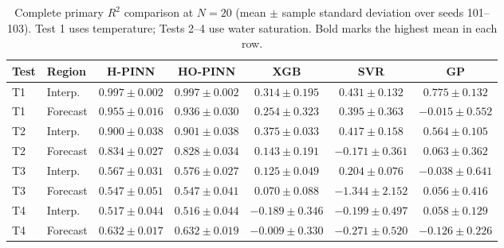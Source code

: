 \begin{table}[t]
\centering
\scriptsize
\setlength{\tabcolsep}{3.2pt}
\caption{Complete primary $R^2$ comparison at $N=20$ (mean $\pm$ sample standard deviation over seeds 101--103). Test 1 uses temperature; Tests 2--4 use water saturation. Bold marks the highest mean in each row.}
\label{tab:primary_full_n20}
\begin{tabular}{@{}llccccc@{}}
\toprule
Test & Region & H-PINN & HO-PINN & XGB & SVR & GP \\
\midrule
T1 & Interp. & \textbf{$0.997\pm0.002$} & $0.997\pm0.002$ & $0.314\pm0.195$ & $0.431\pm0.132$ & $0.775\pm0.132$ \\
T1 & Forecast & \textbf{$0.955\pm0.016$} & $0.936\pm0.030$ & $0.254\pm0.323$ & $0.395\pm0.363$ & $-0.015\pm0.552$ \\
\addlinespace[1pt]
T2 & Interp. & $0.900\pm0.038$ & \textbf{$0.901\pm0.038$} & $0.375\pm0.033$ & $0.417\pm0.158$ & $0.564\pm0.105$ \\
T2 & Forecast & \textbf{$0.834\pm0.027$} & $0.828\pm0.034$ & $0.143\pm0.191$ & $-0.171\pm0.361$ & $0.063\pm0.362$ \\
\addlinespace[1pt]
T3 & Interp. & $0.567\pm0.031$ & \textbf{$0.576\pm0.027$} & $0.125\pm0.049$ & $0.204\pm0.076$ & $-0.038\pm0.641$ \\
T3 & Forecast & $0.547\pm0.051$ & \textbf{$0.547\pm0.041$} & $0.070\pm0.088$ & $-1.344\pm2.152$ & $0.056\pm0.416$ \\
\addlinespace[1pt]
T4 & Interp. & \textbf{$0.517\pm0.044$} & $0.516\pm0.044$ & $-0.189\pm0.346$ & $-0.199\pm0.497$ & $0.058\pm0.129$ \\
T4 & Forecast & $0.632\pm0.017$ & \textbf{$0.632\pm0.019$} & $-0.009\pm0.330$ & $-0.271\pm0.520$ & $-0.126\pm0.226$ \\
\bottomrule
\end{tabular}
\end{table}
